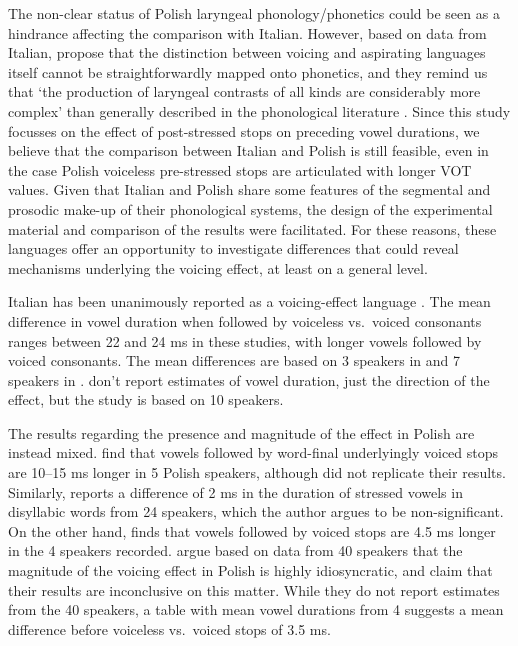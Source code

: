 \documentclass[charis]{glossa}
\begin{document}
The non-clear status of Polish laryngeal phonology/phonetics could be
seen as a hindrance affecting the comparison with Italian. However,
based on data from Italian, \citeauthor{kirby2016a} propose that the
distinction between voicing and aspirating languages itself
\citep{beckman2013} cannot be straightforwardly mapped onto phonetics,
and they remind us that `the production of laryngeal contrasts of all
kinds are considerably more complex' than generally described in the
phonological literature \citep[2409]{kirby2016a}. Since this study
focusses on the effect of post-stressed stops on preceding vowel
durations, we believe that the comparison between Italian and Polish is
still feasible, even in the case Polish voiceless pre-stressed stops are
articulated with longer VOT values. Given that Italian and Polish share
some features of the segmental and prosodic make-up of their
phonological systems, the design of the experimental material and
comparison of the results were facilitated. For these reasons, these
languages offer an opportunity to investigate differences that could
reveal mechanisms underlying the voicing effect, at least on a general
level.

Italian has been unanimously reported as a voicing-effect language
\citep{caldognetto1979, farnetani1986, esposito2002}. The mean
difference in vowel duration when followed by voiceless vs.~voiced
consonants ranges between 22 and 24 ms in these studies, with longer
vowels followed by voiced consonants. The mean differences are based on
3 speakers in \citealt{farnetani1986} and 7 speakers in
\citealt{esposito2002}. \citet{caldognetto1979} don't report estimates
of vowel duration, just the direction of the effect, but the study is
based on 10 speakers.

The results regarding the presence and magnitude of the effect in Polish
are instead mixed. \citet{slowiaczek1985} find that vowels followed by
word-final underlyingly voiced stops are 10--15 ms longer in 5 Polish
speakers, although \citet{jassem1989} did not replicate their results.
Similarly, \citet{keating1984} reports a difference of 2 ms in the
duration of stressed vowels in disyllabic words from 24 speakers, which
the author argues to be non-significant. On the other hand,
\citet{nowak2006} finds that vowels followed by voiced stops are 4.5 ms
longer in the 4 speakers recorded. \citet{malisz2008} argue based on
data from 40 speakers that the magnitude of the voicing effect in Polish
is highly idiosyncratic, and claim that their results are inconclusive
on this matter. While they do not report estimates from the 40 speakers,
a table with mean vowel durations from 4 suggests a mean difference
before voiceless vs.~voiced stops of 3.5 ms.
\end{document}
